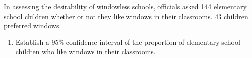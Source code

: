   \item %
    In assessing the desirability of windowless schools, officials asked 144
    elementary school children whether or not they like windows in their
    classrooms. 43 children preferred
    windows.
    \begin{enumerate}
      \item Establish a 95\% confidence interval of the proportion of elementary school
        children who like windows in their classrooms.
    \end{enumerate}

